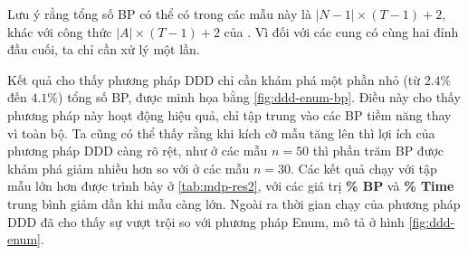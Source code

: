 \documentclass[../main.tex]{subfiles}
\begin{document}
Lưu ý rằng tổng số BP có thể có trong các mẫu này là
\(|N − 1| \times (T − 1) + 2\), khác với công thức
\(|A| \times (T − 1) + 2\) của \cite{foschini2011complexity}. Vì đối
với các cung có cùng hai đỉnh đầu cuối, ta chỉ cần xử lý một lần.



Kết quả cho thấy phương pháp DDD chỉ cần khám phá một phần nhỏ (từ
\(2.4\%\) đến \(4.1\%\)) tổng số BP, được minh họa bằng \autoref{fig:ddd-enum-bp}. Điều này cho thấy phương pháp này
hoạt động hiệu quả, chỉ tập trung vào các BP tiềm năng thay vì toàn bộ.
Ta cũng có thể thấy rằng khi kích cỡ mẫu tăng lên thì
lợi ích của phương pháp DDD càng rõ rệt, như ở các mẫu \(n=50\) thì phần trăm BP được khám phá
giảm nhiều hơn so với ở các mẫu \(n=30\). Các kết quả chạy với tập mẫu lớn hơn được
trình bày ở \autoref{tab:mdp-res2}, với các giá trị \textbf{\% BP} và \textbf{\% Time} trung bình giảm dần khi mẫu
càng lớn. Ngoài ra thời gian chạy của phương pháp DDD đã cho thấy sự vượt trội so với phương pháp Enum, mô tả ở hình \autoref{fig:ddd-enum}.




%

\begin{figure}[]
\end{figure}

\backmatter
\end{document}
